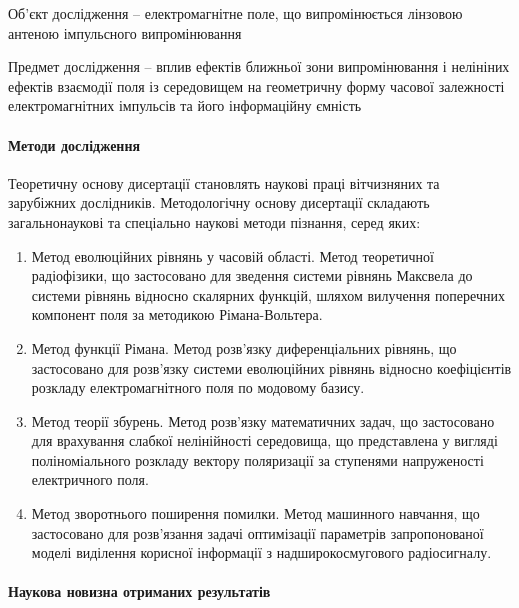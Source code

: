 Об’єкт дослідження -- електромагнітне поле, що випромінюється лінзовою антеною 
імпульсного випромінювання

Предмет дослідження -- вплив ефектів ближньої зони випромінювання і нелініних 
ефектів взаємодії поля із середовищем на геометричну форму часової залежності
електромагнітних імпульсів та його інформаційну ємність

\paragraph{Методи дослідження}

Теоретичну основу дисертації становлять наукові праці вітчизняних та 
зарубіжних дослідників. Методологічну основу дисертації складають 
загальнонаукові та спеціально наукові методи пізнання, серед яких:

\begin{enumerate}

\item Метод еволюційних рівнянь у часовій області. Метод теоретичної 
радіофізики, що застосовано для зведення системи рівнянь Максвела до 
системи рівнянь відносно скалярних функцій, шляхом вилучення поперечних 
компонент поля за методикою Рімана-Вольтера.

\item Метод функції Рімана. Метод розв'язку диференціальних рівнянь, що
застосовано для розв'язку системи еволюційних рівнянь відносно коефіцієнтів 
розкладу електромагнітного поля по модовому базису.

\item Метод теорії збурень. Метод розв'язку математичних задач, що 
застосовано для врахування слабкої нелінійності середовища, що представлена 
у вигляді поліноміального розкладу вектору поляризації за ступенями 
напруженості електричного поля.

\item Метод зворотнього поширення помилки. Метод машинного навчання,
що застосовано для розв'язання задачі оптимізації параметрів запропонованої 
моделі виділення корисної інформації з надширокосмугового радіосигналу.

\end{enumerate}

\paragraph{Наукова новизна отриманих результатів}

